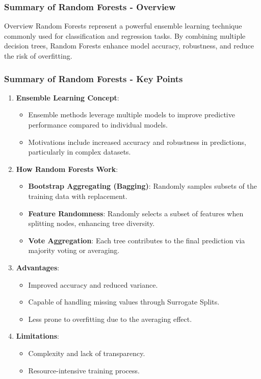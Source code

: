 \documentclass[aspectratio=169]{beamer}
\begin{document}
\begin{frame}[fragile]
    \frametitle{Summary of Random Forests - Overview}
    \begin{block}{Overview}
        Random Forests represent a powerful ensemble learning technique commonly used for classification and regression tasks. 
        By combining multiple decision trees, Random Forests enhance model accuracy, robustness, and reduce the risk of overfitting.
    \end{block}
\end{frame}

\begin{frame}[fragile]
    \frametitle{Summary of Random Forests - Key Points}
    \begin{enumerate}
        \item \textbf{Ensemble Learning Concept}:
        \begin{itemize}
            \item Ensemble methods leverage multiple models to improve predictive performance compared to individual models.
            \item Motivations include increased accuracy and robustness in predictions, particularly in complex datasets.
        \end{itemize}

        \item \textbf{How Random Forests Work}:
        \begin{itemize}
            \item \textbf{Bootstrap Aggregating (Bagging)}: Randomly samples subsets of the training data with replacement.
            \item \textbf{Feature Randomness}: Randomly selects a subset of features when splitting nodes, enhancing tree diversity.
            \item \textbf{Vote Aggregation}: Each tree contributes to the final prediction via majority voting or averaging.
        \end{itemize}

        \item \textbf{Advantages}:
        \begin{itemize}
            \item Improved accuracy and reduced variance.
            \item Capable of handling missing values through Surrogate Splits.
            \item Less prone to overfitting due to the averaging effect.
        \end{itemize}

        \item \textbf{Limitations}:
        \begin{itemize}
            \item Complexity and lack of transparency.
            \item Resource-intensive training process.
        \end{itemize}
    \end{enumerate}
\end{frame}
\end{document}
